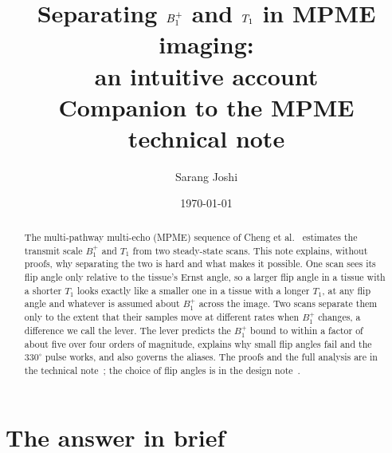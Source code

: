 \documentclass[11pt]{article}
\title{Separating $\Bone$ and $\Tone$ in MPME imaging:\\ an intuitive account\\[4pt]
\large Companion to the MPME technical note}
\author{Sarang Joshi}
\date{\today}
\newcommand{\Bone}{B_1^{+}}
\newcommand{\Tone}{T_1}
\begin{document}
\maketitle

\begin{abstract}
The multi-pathway multi-echo (MPME) sequence of Cheng et al.~\cite{cheng2019} estimates the
transmit scale $\Bone$ and $\Tone$ from two steady-state scans. This note explains, without proofs,
why separating the two is hard and what makes it possible. One scan sees its flip angle only
relative to the tissue's Ernst angle, so a larger flip angle in a tissue with a shorter $\Tone$
looks exactly like a smaller one in a tissue with a longer $\Tone$, at any flip angle and whatever
is assumed about $\Bone$ across the image. Two scans separate them only to the extent that their
samples move at different rates when $\Bone$ changes, a difference we call the lever. The lever
predicts the $\Bone$ bound to within a factor of about five over four orders of magnitude, explains why
small flip angles fail and the $330^\circ$ pulse works, and also governs the aliases. The proofs and the full analysis are in the
technical note~\cite{technote}; the choice of flip angles is in the design note~\cite{flipnote}.
\end{abstract}

\section*{The answer in brief}
\end{document}
